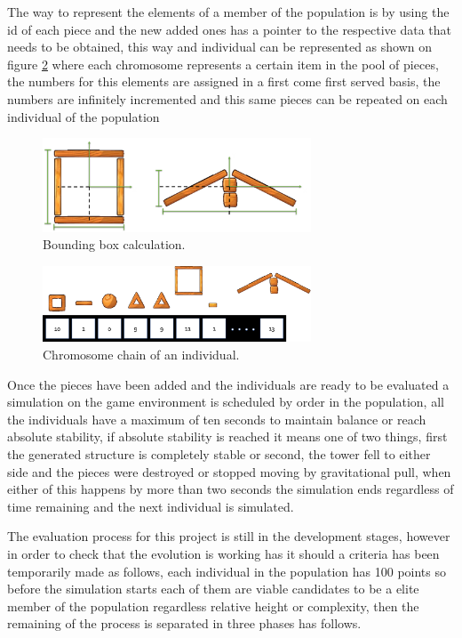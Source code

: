 \documentclass[conference]{IEEEtran}
\begin{document}
The way to represent the elements of a member of the population is by using the
id of each piece and the new added ones has a pointer to the respective data
that needs to be obtained, this way and individual can be represented as shown
on figure \ref{old_chrom} where each chromosome represents a certain item in the
pool of pieces, the numbers for this elements are assigned in a first come first
served basis, the numbers are infinitely incremented and this same pieces can be
repeated on each individual of the population

\begin{figure}[htbp]
\centerline{\includegraphics[width=80mm]{Images/bounding_box_calculation.png}}
\caption{Bounding box calculation.}
\label{bounding_boc_calc}
\end{figure}

\begin{figure}[htbp]
\centerline{\includegraphics[width=80mm]{Images/chromosome_chain_example.png}}
\caption{Chromosome chain of an individual.}
\label{old_chrom}
\end{figure}

Once the pieces have been added and the individuals are ready to be evaluated a
simulation on the game environment is scheduled by order in the population, all
the individuals have a maximum of ten seconds to maintain balance or reach
absolute stability, if absolute stability is reached it means one of two things,
first the generated structure is completely stable or second, the tower fell to
either side and the pieces were destroyed or stopped moving by gravitational
pull, when either of this happens by more than two seconds the simulation ends
regardless of time remaining and the next individual is simulated.

The evaluation process for this project is still in the development stages,
however in order to check that the evolution is working has it should a criteria
has been temporarily made as follows, each individual in the population has 100
points so before the simulation starts each of them are viable candidates to be
a elite member of the population regardless relative height or complexity, then
the remaining of the process is separated in three phases has follows.
\end{document}
